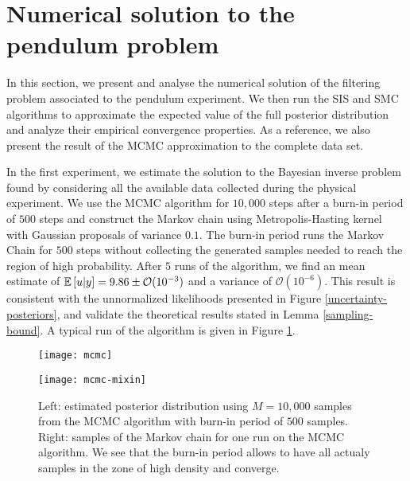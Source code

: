 \section{Numerical solution to the pendulum problem}
In this section, we present and analyse the numerical solution of the filtering problem associated to the pendulum experiment. We then run the SIS and SMC algorithms to approximate the expected value of the full posterior distribution and analyze their empirical convergence properties. As a reference, we also present the result of the MCMC approximation to the complete data set.

In the first experiment, we estimate the solution to the Bayesian inverse problem found by considering all the available data collected during the physical experiment. We use the MCMC algorithm for $10,000$ steps after a burn-in period of $500$ steps and construct the Markov chain using Metropolis-Hasting kernel with Gaussian proposals of variance $0.1$. The burn-in period runs the Markov Chain for $500$ steps without collecting the generated samples needed to reach the region of high probability. After $5$ runs of the algorithm, we find an mean estimate of $\mathbb{E}\left[u|y\right] = 9.86 \pm \mathcal{O}(10^{-3})$ and a variance of $\mathcal{O}(10^{-6})$. This result is consistent with the unnormalized likelihoods presented in Figure \ref{uncertainty-posteriors}, and validate the theoretical results stated in Lemma \ref{sampling-bound}. A typical run of the algorithm is given in Figure \ref{mcmc-figure}.

\begin{figure}[!b]
  \label{mcmc-figure}
  \begin{minipage}{.43\textwidth}
    \texttt{[image: mcmc]}
  \end{minipage}
  \begin{minipage}{.5\textwidth}
    \texttt{[image: mcmc-mixin]}
  \end{minipage}
  \caption{Left: estimated posterior distribution using $M=10,000$ samples from the MCMC algorithm with burn-in period of $500$ samples. Right: samples of the Markov chain for one run on the MCMC algorithm. We see that the burn-in period allows to have all actualy samples in the zone of high density and converge.}
\end{figure}

